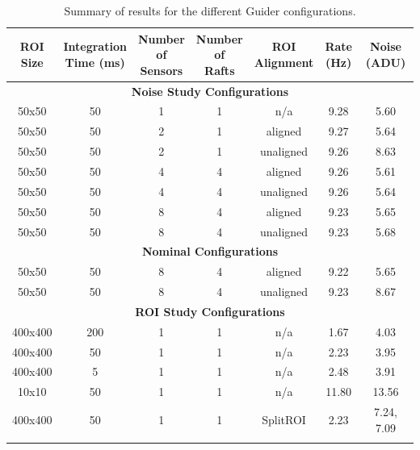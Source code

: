\begin{longtable}[th]{|c|c|c|c|c|c|c|}
\caption{Summary of results for the different Guider configurations.}\\
\hline
\makecell{\textbf{ROI} \\ \textbf{Size}} & 
\makecell{\textbf{Integration} \\ \textbf{Time (ms)}} & 
\makecell{\textbf{Number} \\ \textbf{of} \\ \textbf{Sensors}} &
\makecell{\textbf{Number} \\ \textbf{of} \\ \textbf{Rafts}} &
\makecell{\textbf{ROI} \\ \textbf{Alignment}} &
\makecell{\textbf{Rate} \\ \textbf{(Hz)}} &
\makecell{\textbf{Noise} \\ \textbf{(ADU)}} \\
\hline
\hline
\endhead
\multicolumn{7}{|c|}{\textbf{Noise Study Configurations}} \\
\hline
50x50   & 50  & 1 & 1 & n/a       &  9.28 & 5.60 \\ %
50x50   & 50  & 2 & 1 & aligned   &  9.27 & 5.64 \\ %
50x50   & 50  & 2 & 1 & unaligned &  9.26 & 8.63 \\ %
50x50   & 50  & 4 & 4 & aligned   &  9.26 & 5.61 \\ %
50x50   & 50  & 4 & 4 & unaligned &  9.26 & 5.64 \\ %
50x50   & 50  & 8 & 4 & aligned   &  9.23 & 5.65 \\ %
50x50   & 50  & 8 & 4 & unaligned &  9.23 & 5.68 \\ %
\hline
\multicolumn{7}{|c|}{\textbf{Nominal Configurations}} \\
\hline
50x50   & 50  & 8 & 4 & aligned   &  9.22 & 5.65 \\ %
50x50   & 50  & 8 & 4 & unaligned &  9.23 & 8.67 \\ %
\hline
\multicolumn{7}{|c|}{\textbf{ROI Study Configurations}} \\
\hline
400x400 & 200 & 1 & 1 & n/a       &  1.67 & 4.03 \\ %
400x400 &  50 & 1 & 1 & n/a       &  2.23 & 3.95 \\ %
400x400 &   5 & 1 & 1 & n/a       &  2.48 & 3.91 \\ %
10x10   &  50 & 1 & 1 & n/a       & 11.80 & 13.56 \\ %
400x400 &  50 & 1 & 1 & SplitROI  &  2.23 & 7.24, 7.09 \\ %
\hline
\label{tab:gds_configs}
\end{longtable}

